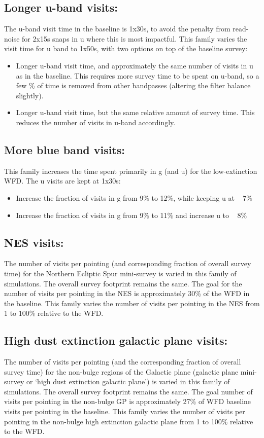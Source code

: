 \subsection{Longer u-band visits:}
The u-band visit time in the baseline is 1x30s, to avoid the penalty from read-noise for 2x15s snaps in u where this is most impactful. This family varies the visit time for u band to 1x50s, with two options on top of the baseline survey: 
\begin{itemize}
\item Longer u-band visit time, and approximately the same number of visits in u as in the baseline. This requires more survey time to be spent on u-band, so a few \% of time is removed from other bandpasses (altering the filter balance slightly). 
\item Longer u-band visit time, but the same relative amount of survey time. This reduces the number of visits in u-band accordingly.
\end{itemize} 

\subsection{More blue band visits:}
This family increases the time spent primarily in g (and u) for the low-extinction WFD. The u visits are kept at 1x30s: 
\begin{itemize}
\item Increase the fraction of visits in g from 9\% to 12\%, while keeping u at ~ 7\%
\item Increase the fraction of visits in g from 9\% to 11\% and increase u to ~ 8\%
\end{itemize}

\subsection{NES visits:}
The number of visits per pointing (and corresponding fraction of overall survey time) for the Northern Ecliptic Spur mini-survey is varied in this family of simulations. The overall survey footprint remains the same. The goal for the number of visits per pointing in the NES is approximately 30\% of the WFD in the baseline. This family varies the number of visits per pointing in the NES from 1 to 100\% relative to the WFD. 

\subsection{High dust extinction galactic plane visits: }
The number of visits per pointing (and the corresponding fraction of overall survey time) for the non-bulge regions of the Galactic plane (galactic plane mini-survey or `high dust extinction galactic plane') is varied in this family of simulations. The overall survey footprint remains the same. The goal number of visits per pointing in the non-bulge GP is approximately 27\% of WFD baseline visits per pointing in the baseline.  This family varies the number of visits per pointing in the non-bulge high extinction galactic plane from 1 to 100\% relative to the WFD.


